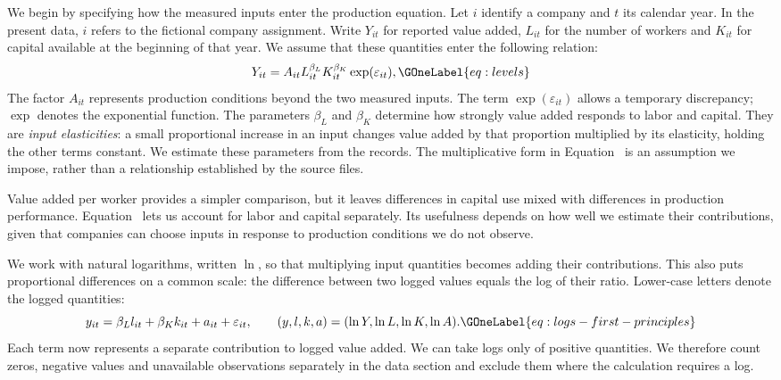 We begin by specifying how the measured inputs enter the production equation. Let $i$ identify a company and $t$ its calendar year. In the present data, $i$ refers to the fictional company assignment. Write $Y_{it}$ for reported value added, $L_{it}$ for the number of workers and $K_{it}$ for capital available at the beginning of that year. We assume that these quantities enter the following relation:
\begin{equation}
Y_{it}=A_{it}L_{it}^{\beta_L}K_{it}^{\beta_K}\exp(\varepsilon_{it}),
\GOneLabel{eq:levels}
\end{equation}
The factor $A_{it}$ represents production conditions beyond the two measured inputs. The term $\exp(\varepsilon_{it})$ allows a temporary discrepancy; $\exp$ denotes the exponential function. The parameters $\beta_L$ and $\beta_K$ determine how strongly value added responds to labor and capital. They are \emph{input elasticities}: a small proportional increase in an input changes value added by that proportion multiplied by its elasticity, holding the other terms constant. We estimate these parameters from the records. The multiplicative form in Equation~ is an assumption we impose, rather than a relationship established by the source files.

Value added per worker provides a simpler comparison, but it leaves differences in capital use mixed with differences in production performance. Equation~ lets us account for labor and capital separately. Its usefulness depends on how well we estimate their contributions, given that companies can choose inputs in response to production conditions we do not observe.

We work with natural logarithms, written $\ln$, so that multiplying input quantities becomes adding their contributions. This also puts proportional differences on a common scale: the difference between two logged values equals the log of their ratio. Lower-case letters denote the logged quantities:
\begin{equation}
y_{it}=\beta_Ll_{it}+\beta_Kk_{it}+a_{it}+\varepsilon_{it},\qquad
(y,l,k,a)=(\ln Y,\ln L,\ln K,\ln A).
\GOneLabel{eq:logs-first-principles}
\end{equation}
Each term now represents a separate contribution to logged value added. We can take logs only of positive quantities. We therefore count zeros, negative values and unavailable observations separately in the data section and exclude them where the calculation requires a log.

